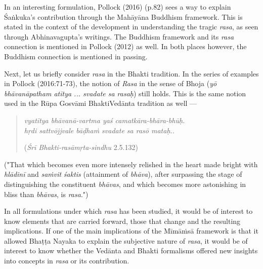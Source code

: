 In an interesting formulation, Pollock (2016) (p.82) sees a way to explain Śaṅkuka’s contribution through the Mahāyāna Buddhism framework. This is stated in the context of the development in understanding the tragic \textsl{rasa}, as seen through Abhinavagupta’s writings. The Buddhism framework and its \textsl{rasa} connection is mentioned in Pollock (2012) as well. In both places however, the Buddhism connection is mentioned in passing. 

Next, let us briefly consider \textsl{rasa} in the Bhakti tradition. In the series of examples in Pollock (2016:71-73), the notion of \textsl{Rasa} in the sense of Bhoja (\textsl{yō bhāvanāpatham atītya ... svadate sa rasaḥ}) still holds. This is the same notion used in the Rūpa Gosvāmi BhaktiVedānta
 tradition as well --- 
\begin{quote}
\textsl{vyatītya bhāvanā-vartma yaś camatkāra-bhāra-bhūḥ.}\\
\textsl{hṛdi sattvōjjvale bāḍhaṁ svadate sa rasō mataḥ..}

\hfill (\textsl{Śrī Bhakti-rasāmṛta-sindhu} 2.5.132)
\end{quote}

("That which becomes even more intensely relished in the heart made bright with \textsl{hlādinī} and \textsl{saṁvit} \textsl{śaktis} (attainment of \textsl{bhāva}), after surpassing the stage of distinguishing the constituent \textsl{bhāvas}, and which becomes more astonishing in bliss than \textsl{bhāvas}, is \textsl{rasa}.")

In all formulations under which \textsl{rasa} has been studied, it would be of interest to know elements that are carried forward, those that change and the resulting implications. If one of the main implications of the Mīmāṁsā framework is that it allowed Bhaṭṭa Nayaka to explain the subjective nature of \textsl{rasa}, it would be of interest to know whether the Vedānta and Bhakti formalisms offered new insights into concepts in \textsl{rasa} or its contribution.\\[-20pt]  

